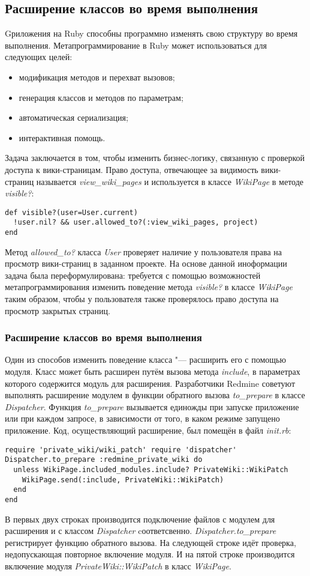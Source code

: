 \subsection{Расширение классов во время выполнения}
\label{section:metaprogramming} 
Gриложения на Ruby способны программно изменять свою структуру во время
выполнения. Метапрограммирование в Ruby может использоваться для следующих
целей:
\begin{itemize}
  \item модификация методов и перехват вызовов;
  \item генерация классов и методов по параметрам;
  \item автоматическая сериализация;
  \item интерактивная помощь.
\end{itemize}

Задача заключается в том, чтобы изменить бизнес-логику, связанную с проверкой
доступа к вики-страницам. Право доступа, отвечающее за видимость вики-страниц
называется \textit{view\_wiki\_pages} и используется в классе \textit{WikiPage}
в методе
\textit{visible?}:
\small{\begin{lstlisting}
def visible?(user=User.current)
  !user.nil? && user.allowed_to?(:view_wiki_pages, project)
end
\end{lstlisting}}
Метод \textit{allowed\_to?} класса \textit{User} проверяет наличие у
пользователя права на просмотр вики-страниц в заданном проекте. На основе
данной иноформации задача была переформулирована: требуется с помощью
возможностей метапрограммирования изменить поведение метода \textit{visible?} в
классе \textit{WikiPage} таким образом, чтобы у пользователя также проверялось
право доступа на просмотр закрытых страниц.

\subsubsection{Расширение классов во время выполнения} 
Один из способов изменить поведение класса "--- расширить его с помощью модуля.
 Класс может быть расширен
путём вызова метода \textit{include}, в параметрах которого содержится модуль
для расширения. Разработчики Redmine советуют выполнять расширение модулем в
функции обратного вызова \textit{to\_prepare} в классе \textit{Dispatcher}.
Функция \textit{to\_prepare} вызывается единожды при запуске приложение или при
каждом запросе, в зависимости от того, в каком режиме запущено приложение. Код,
осуществляющий расширение, был помещён в файл \textit{init.rb}:
\small{\begin{lstlisting}
require 'private_wiki/wiki_patch' require 'dispatcher'
Dispatcher.to_prepare :redmine_private_wiki do
  unless WikiPage.included_modules.include? PrivateWiki::WikiPatch
    WikiPage.send(:include, PrivateWiki::WikiPatch)
  end 
end
\end{lstlisting}}
В первых двух строках производится подключение файлов с модулем для расширения
и с классом \textit{Dispatcher} cоответсвенно. \textit{Dispatcher.to\_prepare}
регистрирует функцию обратного вызова. На следующей строке идёт проверка,
недопускающая повторное включение модуля. И на пятой строке производится
включение модуля \textit{PrivateWiki::WikiPatch} в класс \textit{WikiPage}.

